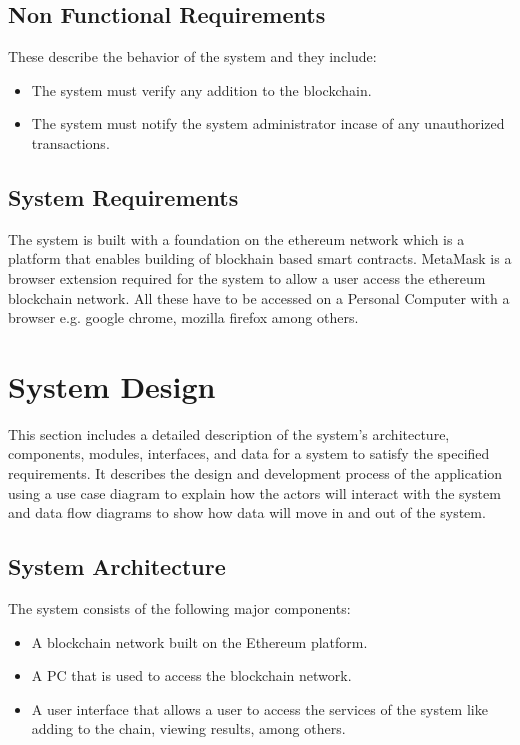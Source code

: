 \subsection{Non Functional Requirements}
These describe the behavior of the system and they include:
\begin{itemize}
\item The system must verify any addition to the blockchain.
\item The system must notify the system administrator incase of any unauthorized transactions.
\end{itemize}

\subsection{System Requirements}
The system is built with a foundation on the ethereum network which is a platform that enables building of blockhain based smart contracts. MetaMask is a browser extension required for the system to allow a user access the ethereum blockchain network. All these have to be accessed on a Personal Computer with a browser e.g. google chrome, mozilla firefox among others.

\section{System Design}
This section includes a detailed description of the system’s architecture, components, modules, interfaces, and data for a system to satisfy the specified requirements. It describes the design and development process of the application using a use case diagram to explain how the actors will interact with the system and data flow diagrams to show how data will move in and out of the system.  

\subsection{System Architecture}
The system consists of the following major components:
\begin{itemize}
\item A blockchain network built on the Ethereum platform.
\item A PC that is used to access the blockchain network.
\item A user interface that allows a user to access the services of the system like adding to the chain, viewing results, among others.
\end{itemize}


